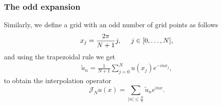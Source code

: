 	\subsubsection{The odd expansion}
	
	Similarly, we define a grid with an odd number of grid points as follows
	\begin{align*}
        x_j = \frac{2 \pi}{N + 1} j , \hspace{0.5cm} j\in [0, \dots , N],
    \end{align*}
    and using the trapezoidal rule we get
	\begin{align}
	\label{coefficients_JN}
        \widetilde{u}_n = \frac{1}{N + 1}  \displaystyle \sum_{j = 0}^{N} u(x_j) e^{-in x_j},
    \end{align}
    to obtain the interpolation operator
    \begin{equation}
    \label{collocation_operator_odd}
    	\mathcal{J}_N u(x) =  \displaystyle \sum_{ |n| \leq \frac {N}{2}} \widetilde{u}_n e^{inx}.
	\end{equation}
	
